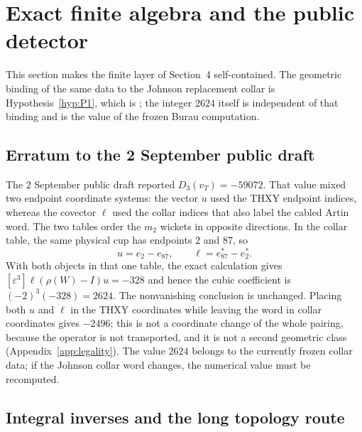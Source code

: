 \section{Exact finite algebra and the public detector}\label{sec:exact-algebra}

This section makes the finite layer of Section~4 self-contained.  The
geometric binding of the same data to the Johnson replacement collar is
Hypothesis~\ref{hyp:P1}, which is \Open; the integer $2624$ itself is
independent of that binding and is the value of the frozen Burau
computation.

\subsection{Erratum to the 2 September public draft}

The 2 September public draft reported $D_3(v_T)=-59072$.  That value mixed
two endpoint coordinate systems: the vector $u$ used the THXY endpoint
indices, whereas the covector $\ell$ used the collar indices that also label
the cabled Artin word.  The two tables order the $m_2$ wickets in opposite
directions.  In the collar table, the same physical cup has endpoints $2$
and $87$, so
\[
  u=e_2-e_{87},\qquad \ell=e_{87}^*-e_2^*.
\]
With both objects in that one table, the exact calculation gives
$[\varepsilon^3]\ell(\rho(W)-I)u=-328$ and hence the cubic coefficient is
$(-2)^3(-328)=2624$.  The nonvanishing conclusion is unchanged.
Placing both $u$ and $\ell$ in the THXY coordinates while leaving the word
in collar coordinates gives $-2496$; this is not a coordinate change of the
whole pairing, because the operator is not transported, and it is not a
second geometric class (Appendix~\ref{app:legality}).  The value $2624$ belongs to the
currently frozen collar data; if the Johnson collar word changes, the
numerical value must be recomputed.

\subsection{Integral inverses and the long topology route}

